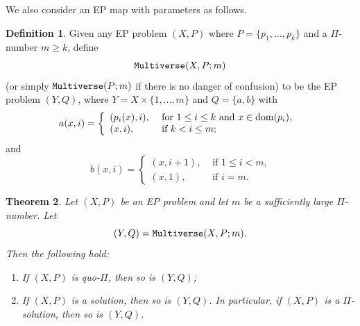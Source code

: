 \documentclass[11pt]{amsart}
\newtheorem{theorem}{Theorem}[section]
\theoremstyle{definition}
\newtheorem{definition}[theorem]{Definition}
\newcommand{\dom}{{\mbox{\rm dom}}}
\theoremstyle{definition}
\numberwithin{equation}{section}
\begin{document}
We also consider an EP map with parameters as follows.

\begin{definition}\label{def:multiverse2} Given any EP problem $(X, P)$ where $P=\{p_1,\dots, p_k\}$ and a $\Pi$-number $m\geq k$, define 
$${\tt Multiverse}(X, P; m)$$ (or simply $\mbox{\tt Multiverse}(P; m)$ if there is no danger of confusion) to be the EP problem $(Y, Q)$, where $Y=X\times\{1,\dots, m\}$ and $Q=\{a, b\}$
with
$$ a(x,i)= \left\{\begin{array}{ll} (p_i(x),i), &\mbox{ for $1\leq i\leq k$ and $x\in\dom(p_i)$, } \\
(x, i), & \mbox{ if $k<i\leq m$;} \end{array}\right. 
$$
and 
$$ 
b(x,i)=\left\{\begin{array}{ll} (x, i+1), & \mbox{ if $1\leq i<m$,} \\ (x, 1), & \mbox{ if $i=m$.}\end{array}\right.
$$
\end{definition}

\begin{theorem}\label{thm:multiverse2} Let $(X, P)$ be an EP problem and let $m$ be a sufficiently large $\Pi$-number. Let
$$ (Y, Q)={\tt Multiverse}(X, P; m). $$
Then the following hold:
\begin{enumerate}
\item[\rm (i)] If $(X, P)$ is quo-$\Pi$, then so is $(Y, Q)$;
\item[\rm (ii)] If $(X, P)$ is a solution, then so is $(Y, Q)$. In particular, if $(X, P)$ is a $\Pi$-solution, then so is $(Y, Q)$.
\end{enumerate}
\end{theorem}
\end{document}

